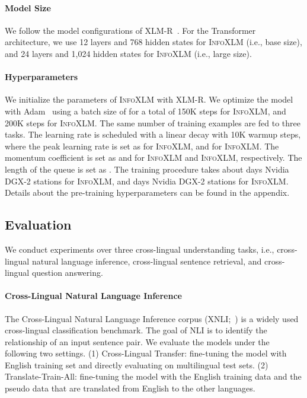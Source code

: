\documentclass[11pt,a4paper]{article}
\newcommand\our{\textsc{InfoXLM}}
\begin{document}
\paragraph{Model Size}
We follow the model configurations of XLM-R~\cite{xlmr}.
For the Transformer~\cite{transformer} architecture, we use 12 layers and 768 hidden states for \our{} (i.e., base size), and 24 layers and 1,024 hidden states for \our{} (i.e., large size).

\paragraph{Hyperparameters}
We initialize the parameters of \our{} with XLM-R.
We optimize the model with Adam~\cite{adam} using a batch size of  for a total of 150K steps for \our{}, and 200K steps for \our{}.
The same number of training examples are fed to three tasks.
The learning rate is scheduled with a linear decay with 10K warmup steps, where the peak learning rate is set as  for \our{}, and  for \our{}.
The momentum coefficient is set as  and  for \our{} and \our{}, respectively. The length of the queue is set as .
The training procedure takes about  days   Nvidia DGX-2 stations for \our{}, and  days   Nvidia DGX-2 stations for \our{}.
Details about the pre-training hyperparameters can be found in the appendix.

\subsection{Evaluation}

We conduct experiments over three cross-lingual understanding tasks, i.e., cross-lingual natural language inference, cross-lingual sentence retrieval, and cross-lingual question answering.

\paragraph{Cross-Lingual Natural Language Inference}
The Cross-Lingual Natural Language Inference corpus (XNLI;~\citealt{xnli}) is a widely used cross-lingual classification benchmark. The goal of NLI is to identify the relationship of an input sentence pair. 
We evaluate the models under the following two settings.
(1) Cross-Lingual Transfer: fine-tuning the model with English training set and directly evaluating on multilingual test sets.
(2) Translate-Train-All: fine-tuning the model with the English training data and the pseudo data that are translated from English to the other languages.
\end{document}
